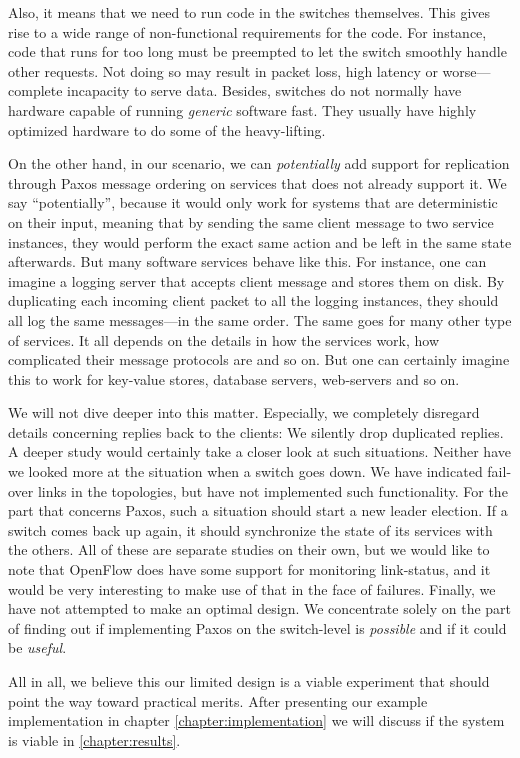 Also, it means that we need to run code in the switches themselves. This
gives rise to a wide range of non-functional requirements for the code.
For instance, code that runs for too long must be
preempted to let the switch smoothly handle other
requests. Not doing so may result in packet loss, high latency or
worse---complete incapacity to serve data. Besides, switches do not normally
have hardware capable of running \textit{generic} software fast. They
usually have highly optimized hardware to do some of the heavy-lifting.

On the other hand, in our scenario, we can \textit{potentially} add support
for replication through Paxos message ordering on services that does not
already support it.
%
We say ``potentially'', because it would only work for systems that are
deterministic on their input, meaning that by sending the same client
message to two service instances, they would perform the exact same action
and be left in the same state afterwards.
%
But many software services behave like this. For instance, one can imagine a
logging server that accepts client message and stores them on disk.
By duplicating each incoming client packet to all the logging instances,
they should all log the same messages---in the same order.
%
The same goes for many other type of services.  It all depends on the
details in how the services work, how complicated their message protocols
are and so on.  But one can certainly imagine this to work for key-value
stores, database servers, web-servers and so on.

We will not dive deeper into this matter.  Especially, we completely
disregard details concerning replies back to the clients: We silently
drop duplicated replies.  A deeper study would certainly take a closer
look at such situations.
%
Neither have we looked more at the situation when a switch goes down.
We have indicated fail-over links in the topologies, but have not
implemented such functionality.  For the part that concerns Paxos, such a
situation should start a new leader election.  If a switch comes back up
again, it should synchronize the state of its services with the others.
All of these are separate studies on their own, but we would like to note
that OpenFlow does have some support for monitoring link-status, and it
would be very interesting to make use of that in the face of failures.
%
Finally, we have not attempted to make an optimal design.  We concentrate
solely on the part of finding out if implementing Paxos on the switch-level
is \textit{possible} and if it could be \textit{useful}.

All in all, we believe this our limited design is a viable experiment that
should point the way toward practical merits.  After presenting our example
implementation in chapter \ref{chapter:implementation} we will discuss if
the system is viable in \ref{chapter:results}.
